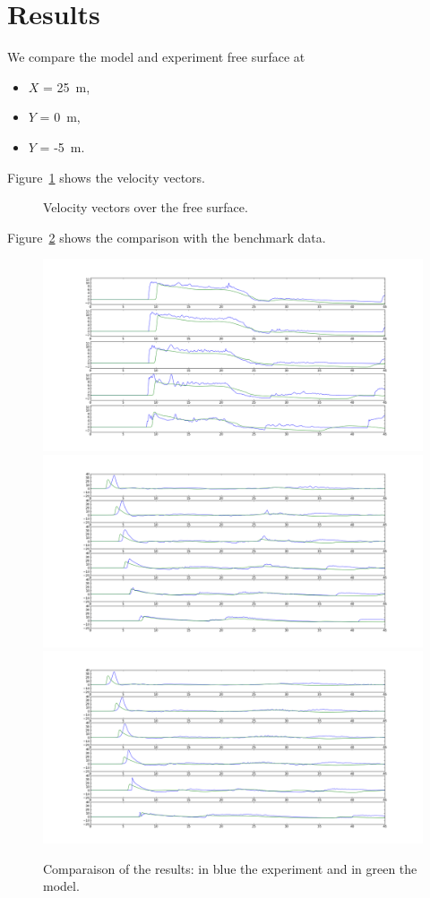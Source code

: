 \section{Results}
We compare the model and experiment free surface at
\begin{itemize}
  \item $X$ = 25~m,
  \item $Y$ =  0~m,
  \item $Y$ = -5~m.
\end{itemize}

Figure~\ref{fig:triang:vel} shows the velocity vectors.

\begin{figure}[H]
\centering
{}
\caption{Velocity vectors over the free surface.}
\label{fig:triang:vel}
\end{figure}

Figure~\ref{fig:triang:res} shows the comparison with the benchmark data.

\begin{figure}[H]
\centering
\includegraphics[width=.8\textwidth]{img/res_X25.png}
\includegraphics[width=.8\textwidth]{img/res_Y0.png}
\includegraphics[width=.8\textwidth]{img/res_Y-5.png}
\caption{Comparaison of the results: in blue the experiment and in green the model.}
\label{fig:triang:res}
\end{figure}
